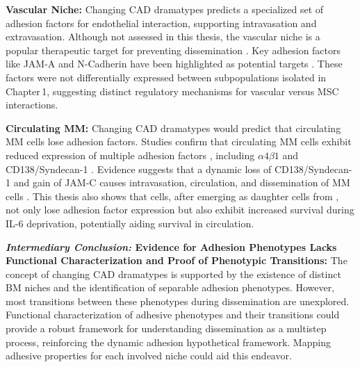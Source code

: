 \textbf{Vascular Niche:}
Changing \ac{CAD} dramatypes predicts a specialized set of adhesion factors for
endothelial interaction, supporting intravasation and extravasation. Although
not assessed in this thesis, the vascular niche is a popular therapeutic target
for preventing dissemination \cite{neriTargetingAdhesionMolecules2012}. Key
adhesion factors like JAM-A and N-Cadherin have been highlighted as potential
targets \cite{solimandoHaltingViciousCycle2020,
      mrozikTherapeuticTargetingNcadherin2015}. These factors were not differentially
expressed between subpopulations isolated in Chapter\,1, suggesting distinct
regulatory mechanisms for vascular versus \ac{MSC} interactions.


\textbf{Circulating MM:}
Changing \ac{CAD} dramatypes would predict that circulating MM cells lose adhesion
factors. Studies confirm that  circulating
\ac{MM} cells exhibit reduced expression of multiple adhesion factors
, including
$\alpha4\beta1$ and CD138/Syndecan-1
\cite{paivaDetailedCharacterizationMultiple2013,
      paivaCompetitionClonalPlasma2011, akhmetzyanovaDynamicCD138Surface2020}.
Evidence suggests that a dynamic loss of CD138/Syndecan-1 and gain of JAM-C
causes intravasation, circulation, and dissemination of MM cells
\cite{akhmetzyanovaDynamicCD138Surface2020,
      brandlJunctionalAdhesionMolecule2022}. This thesis also shows that \nMAina
cells, after emerging as daughter cells from \MAina, not only lose adhesion
factor expression but also exhibit increased survival during IL-6 deprivation,
potentially aiding survival in circulation.


\textbf{\textit{Intermediary Conclusion:} Evidence for Adhesion Phenotypes Lacks Functional Characterization and Proof of Phenotypic Transitions:}
The concept of changing \ac{CAD} dramatypes is supported by the existence of distinct BM
niches and the identification of separable adhesion phenotypes. However, most
transitions between these phenotypes during dissemination are unexplored.
Functional characterization of adhesive phenotypes and their transitions could
provide a robust framework for understanding dissemination as a multistep
process, reinforcing the dynamic adhesion hypothetical framework. Mapping
adhesive properties for each involved niche could aid this endeavor.



